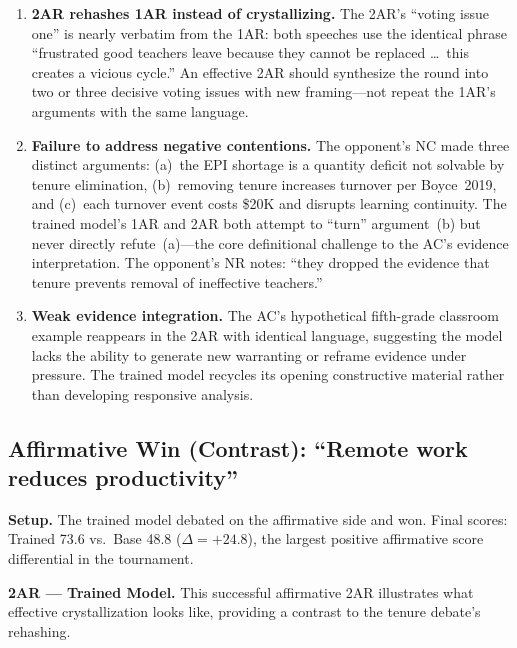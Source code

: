 \begin{enumerate}
\item \textbf{2AR rehashes 1AR instead of crystallizing.}
    The 2AR's ``voting issue one'' is nearly verbatim from the 1AR:
    both speeches use the identical phrase ``frustrated good teachers leave
    because they cannot be replaced \ldots\ this creates a vicious cycle.''
    An effective 2AR should synthesize the round into two or three decisive
    voting issues with new framing---not repeat the 1AR's arguments with
    the same language.

\item \textbf{Failure to address negative contentions.}
    The opponent's NC made three distinct arguments: (a)~the EPI shortage
    is a quantity deficit not solvable by tenure elimination, (b)~removing
    tenure increases turnover per Boyce~2019, and (c)~each turnover event
    costs \$20K and disrupts learning continuity. The trained model's 1AR
    and 2AR both attempt to ``turn'' argument~(b) but never directly
    refute~(a)---the core definitional challenge to the AC's evidence
    interpretation. The opponent's NR notes: ``they dropped the evidence
    that tenure prevents removal of ineffective teachers.''

\item \textbf{Weak evidence integration.}
    The AC's hypothetical fifth-grade classroom example reappears in
    the 2AR with identical language, suggesting the model lacks the
    ability to generate new warranting or reframe evidence under pressure.
    The trained model recycles its opening constructive material rather
    than developing responsive analysis.
\end{enumerate}

\subsection{Affirmative Win (Contrast): ``Remote work reduces productivity''}
\label{app:aff_win_example}

\noindent\textbf{Setup.} The trained model debated on the affirmative side
and won. Final scores: Trained 73.6 vs.\ Base 48.8 ($\Delta = +24.8$),
the largest positive affirmative score differential in the tournament.

\medskip
\noindent\textbf{2AR --- Trained Model.}
This successful affirmative 2AR illustrates what effective crystallization
looks like, providing a contrast to the tenure debate's rehashing.

